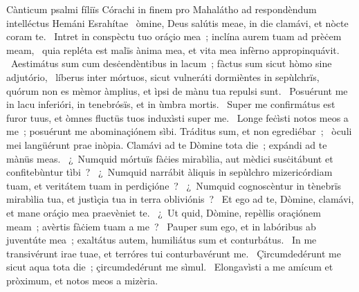 { Cànticum psalmi fíliïs Córachi in finem pro Mahalátho ad respondèndum intelléctus Hemáni Esrahítae}
{%
~òmine, Deus salútis meae, in die clamávi, et nòcte coram te. 
~Intret in conspèctu tuo oráçio mea~; inclína aurem tuam ad prèċem meam, 
~quia repléta est malïs ànima mea, et vita mea infèrno appropinquávit. 
~Aestimátus sum cum desċendèntibus in lacum~; fàctus sum sicut hòmo sine adjutório, 
~líberus inter mórtuos, sicut vulneráti dormièntes in sepùlchrïs, quórum non es mèmor àmplius, et ìpsi de mànu tua repulsi sunt. 
~Posuérunt me in lacu inferióri, in tenebrósïs, et in ùmbra mortis. 
~Super me confirmátus est furor tuus, et òmnes fluctüs tuos induxìsti super me. 
~Longe feċìsti notos meos a me~; posuérunt me abominaçiónem sìbi. Tráditus sum, et non egrediébar~; 
~òculi mei langüérunt prae inòpia. Clamávi ad te Dòmine tota die~; expándi ad te mànüs meas. 
~¿~Numquid mórtuïs fàċies mirabìlia, aut mèdici susċitábunt et confitebùntur tìbi~? 
~¿~Numquid narrábit àliquis in sepùlchro mizericórdiam tuam, et veritátem tuam in perdiçióne~? 
~¿~Numquid cognoscèntur in tènebrïs mirabìlia tua, et justìçia tua in terra obliviónis~? 
~Et ego ad te, Dòmine, clamávi, et mane oráçio mea praevèniet te. 
~¿~Ut quid, Dòmine, repèllis oraçiónem meam~; avèrtis fàċiem tuam a me~? 
~Pauper sum ego, et in labóribus ab juventúte mea~; exaltátus autem, humiliátus sum et conturbátus. 
~In me transivérunt irae tuae, et terróres tui conturbavérunt me. 
~Çircumdedérunt me sicut aqua tota die~; çircumdedérunt me sìmul. 
~Elongavìsti a me amícum et pròximum, et notos meos a mizèria. 
}
